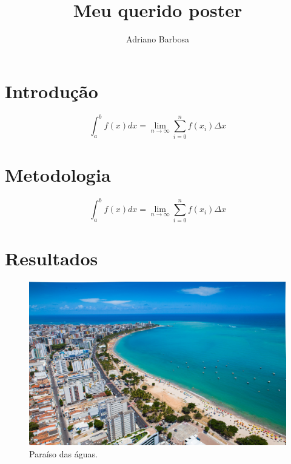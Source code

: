 \documentclass{sciposter}
\author{Adriano Barbosa}
\title{Meu querido poster}
\institute{Universidade Federal da Grande Dourados}
\begin{document}

\maketitle

\begin{multicols}{2}

\begin{abstract}
	\lipsum[1-2]
	\cite{Flusser,Hu}
\end{abstract}

\section{Introdução}
\lipsum[1]
\begin{equation}
	\int_a^b f(x) dx = \lim_{n\rightarrow \infty} \sum_{i=0}^n f(x_i)\Delta x
\end{equation}
\lipsum[2]

\section{Metodologia}
\lipsum[1-2]
\begin{equation}
	\int_a^b f(x) dx = \lim_{n\rightarrow \infty} \sum_{i=0}^n f(x_i)\Delta x
\end{equation}
\lipsum[3-5]

\section{Resultados}
\lipsum[1-2]
\begin{figure}[h]
	\includegraphics[width=\textwidth]{maceio.jpg}
	\caption{Paraíso das águas.}
\end{figure}


\end{multicols}
\end{document}
